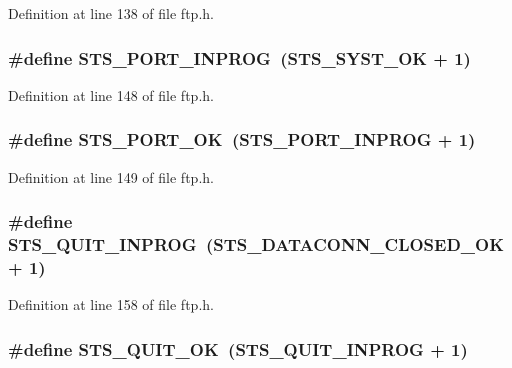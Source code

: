 Definition at line 138 of file ftp.h.

\hypertarget{group__ftp_gac5bed1b6ca25781b6a9f2c0c2a658fe1}{
\subsubsection[{STS\_\-PORT\_\-INPROG}]{\setlength{\rightskip}{0pt plus 5cm}\#define STS\_\-PORT\_\-INPROG~(STS\_\-SYST\_\-OK + 1)}}
\label{group__ftp_gac5bed1b6ca25781b6a9f2c0c2a658fe1}


Definition at line 148 of file ftp.h.

\hypertarget{group__ftp_gaface357a7eb03399c1fcdef69e5e3b21}{
\subsubsection[{STS\_\-PORT\_\-OK}]{\setlength{\rightskip}{0pt plus 5cm}\#define STS\_\-PORT\_\-OK~(STS\_\-PORT\_\-INPROG + 1)}}
\label{group__ftp_gaface357a7eb03399c1fcdef69e5e3b21}


Definition at line 149 of file ftp.h.

\hypertarget{group__ftp_ga9d554fecc84e40fc5afcc97ce4130443}{
\subsubsection[{STS\_\-QUIT\_\-INPROG}]{\setlength{\rightskip}{0pt plus 5cm}\#define STS\_\-QUIT\_\-INPROG~(STS\_\-DATACONN\_\-CLOSED\_\-OK + 1)}}
\label{group__ftp_ga9d554fecc84e40fc5afcc97ce4130443}


Definition at line 158 of file ftp.h.

\hypertarget{group__ftp_ga53b4f88911b5cf48a56f24d5ebefdb7a}{
\subsubsection[{STS\_\-QUIT\_\-OK}]{\setlength{\rightskip}{0pt plus 5cm}\#define STS\_\-QUIT\_\-OK~(STS\_\-QUIT\_\-INPROG + 1)}}
\label{group__ftp_ga53b4f88911b5cf48a56f24d5ebefdb7a}


